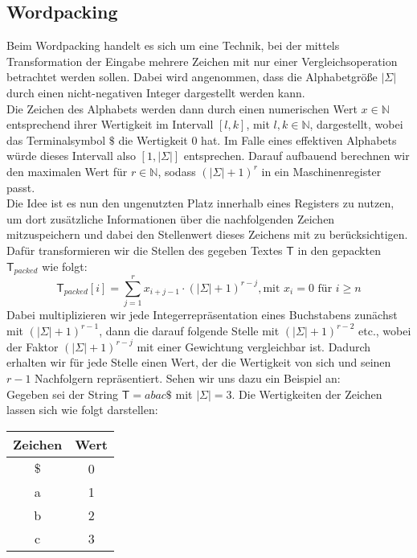 \subsection{Wordpacking}
\label{wordpacking}
Beim Wordpacking \cite{Manber1993} handelt es sich um eine Technik, bei der mittels Transformation der Eingabe mehrere Zeichen mit nur einer Vergleichsoperation betrachtet werden sollen. Dabei wird angenommen, dass die Alphabetgröße $|\Sigma|$ durch einen nicht-negativen Integer dargestellt werden kann.\\
Die Zeichen des Alphabets werden dann durch einen numerischen Wert $x \in \mathbb{N}$  entsprechend ihrer Wertigkeit im Intervall $[l,k]$,  mit $l,k \in \mathbb{N}$, dargestellt, wobei das Terminalsymbol $\$$ die Wertigkeit 0 hat. Im Falle eines effektiven Alphabets würde dieses Intervall also $[1,|\Sigma|]$ entsprechen. Darauf aufbauend berechnen wir den maximalen Wert für $r \in \mathbb{N}$, sodass $(|\Sigma|+1)^r$ in ein Maschinenregister passt.\\
Die Idee ist es nun den ungenutzten Platz innerhalb eines Registers zu nutzen, um dort zusätzliche Informationen über die nachfolgenden Zeichen mitzuspeichern und dabei den Stellenwert dieses Zeichens mit zu berücksichtigen. Dafür transformieren wir die Stellen des gegeben Textes $\mathsf{T}$ in den gepackten $\mathsf{T}_{packed}$ wie folgt:
\begin{equation}
\mathsf{T}_{packed}[i]= \sum_{j=1}^r x_{i+j-1}\cdot(|\Sigma|+1)^{r-j}, \text{mit }  x_i =0 \text{ für } i\geq n
\end{equation}
Dabei multiplizieren wir jede Integerrepräsentation eines Buchstabens zunächst mit $(|\Sigma|+1)^{r-1}$, dann die darauf folgende Stelle mit $(|\Sigma|+1)^{r-2}$ etc., wobei der Faktor $(|\Sigma|+1)^{r-j}$ mit einer Gewichtung vergleichbar ist. Dadurch erhalten wir für jede Stelle einen Wert, der die Wertigkeit von sich und seinen $r-1$ Nachfolgern repräsentiert. Sehen wir uns dazu ein Beispiel an:\\
Gegeben sei der String $\mathsf{T} = abac\$$ mit $|\Sigma|=3$. Die Wertigkeiten der Zeichen lassen sich wie folgt darstellen: 
\begin{center}
\begin{tabular}{c | c}
Zeichen & Wert \\
\hline
$\$$ & 0 \\
a & 1 \\
b & 2 \\
c & 3 
\end{tabular}
\end{center}

